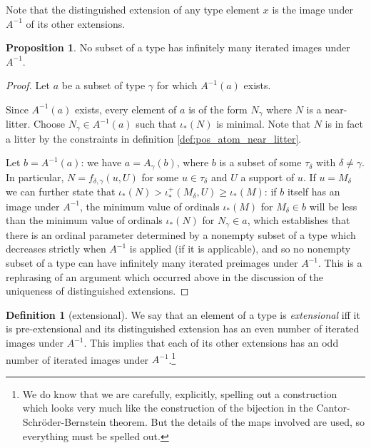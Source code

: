 \documentclass[112pt]{article}
\theoremstyle{definition}
\newtheorem{proposition}[theorem]{Proposition}
\newtheorem{definition}[theorem]{Definition}
\theoremstyle{remark}
\begin{document}
Note that the distinguished extension of any type element $x$ is the image under $A^{-1}$ of its other extensions.

\begin{proposition}\label{prop:a_map_well_founded}
No subset of a type has infinitely many iterated images under $A^{-1}$.
\end{proposition}
\begin{proof}
Let $a$ be a subset of type $\gamma$ for which $A^{-1}(a)$ exists.

Since $A^{-1}(a)$ exists, every element of $a$ is of the form $N_\gamma$ where $N$ is a near-litter.  Choose $N_\gamma \in A^{-1}(a)$ such that $\iota_*(N)$ is minimal.  Note that $N$ is in fact a litter {by the constraints in definition \ref{def:pos_atom_near_litter}}.

Let $b = A^{-1}(a)$:  we have $a = A_\gamma(b)$, where $b$ is a subset of some $\tau_\delta$ with $\delta \neq \gamma$.  In particular, $N = f_{\delta,\gamma}(u,U)$ for
some $u \in \tau_\delta$ and $U$ a support of $u$.  If $u=M_\delta$ we can further state that $\iota_*(N) > \iota^+_*(M_\delta,U) \geq \iota_*(M)$:  if $b$ itself has an image under $A^{-1}$, the minimum value of ordinals $\iota_*(M)$ for $M_\delta \in b$ will be less than the minimum value of ordinals $\iota_*(N)$ for $N_\gamma\in a$, which establishes that there is an ordinal parameter determined by a nonempty subset of a type which decreases strictly when $A^{-1}$ is applied (if it is applicable), and so no nonempty subset of a type
can have infinitely many iterated preimages under $A^{-1}$.  This is a rephrasing of an argument which occurred above in the discussion of the uniqueness of distinguished extensions.
\end{proof}

\begin{definition}[extensional]\label{def:extensional}
We say that an element of a type is {\em extensional\/} iff
it is pre-extensional and its distinguished extension has an even number of iterated images under $A^{-1}$.
This implies that each of its other extensions has an odd number of iterated images under $A^{-1}$.\footnote{We do know that we are carefully, explicitly, spelling out a construction which looks very much
like the construction of the bijection in the Cantor-Schr\"oder-Bernstein theorem.  But the details of the maps involved are used, so everything must be spelled out.}
\end{definition}
\end{document}
